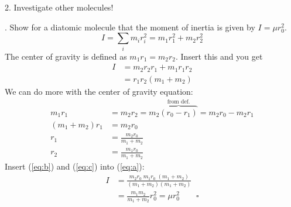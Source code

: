 \documentclass[paper=a4, fontsize=11pt]{scrartcl}
\begin{document}
2. Investigate other molecules!

. Show for a diatomic molecule that the moment of inertia is given by $I = \mu r_0^2$.
\begin{equation*}
  I = \sum_i m_i r_i^2 = m_1 r_1^2 + m_2 r_2^2
\end{equation*}
The center of gravity is defined as $m_1 r_1 = m_2 r_2$. Insert this and you get
\begin{align}
  I &= m_2 r_2 r_1 + m_1 r_1 r_2 \nonumber\\
    &= r_1 r_2 (m_1 + m_2) \label{eq:a}
\end{align}
We can do more with the center of gravity equation:
\begin{align}
  m_1 r_1 &= m_2 r_2 = m_2 \overbrace{(r_0 - r_1)}^\text{from def.} = m_2 r_0 - m_2 r_1 \nonumber\\
  (m_1 + m_2) r_1 &= m_2 r_0 \nonumber\\
  r_1 &= \frac{m_2 r_0}{m_1 + m_2} \label{eq:b}\\
  r_2 &= \frac{m_1 r_0}{m_1 + m_2} \label{eq:c}
\end{align}
Insert (\ref{eq:b}) and (\ref{eq:c}) into (\ref{eq:a}):
\begin{align*}
  I &= \frac{m_2r_0 \; m_1r_0 \; (m_1 + m_2)}{(m_1 + m_2)(m_1 + m_2)} \\
    &= \frac{m_1m_2}{m_1 + m_2} r_0^2 = \mu r_0^2 \qquad\square
\end{align*}
\end{document}
